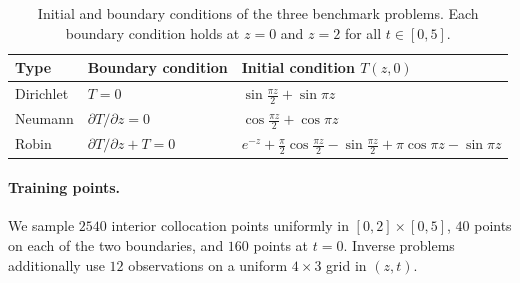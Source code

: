 \begin{table}[h]
\centering
\caption{Initial and boundary conditions of the three benchmark problems. Each boundary condition holds at
$z=0$ and $z=2$ for all $t\in[0,5]$.}
\label{tab:bc}
\small
\begin{tabular}{@{}lll@{}}
\toprule
Type & Boundary condition & Initial condition $T(z,0)$ \\
\midrule
Dirichlet & $T=0$ & $\sin\frac{\pi z}{2}+\sin\pi z$ \\
Neumann   & $\partial T/\partial z=0$ & $\cos\frac{\pi z}{2}+\cos\pi z$ \\
Robin     & $\partial T/\partial z+T=0$ &
  $e^{-z}+\frac{\pi}{2}\cos\frac{\pi z}{2}-\sin\frac{\pi z}{2}+\pi\cos\pi z-\sin\pi z$ \\
\bottomrule
\end{tabular}
\end{table}

\paragraph{Training points.}
We sample $2540$ interior collocation points uniformly in $[0,2]\times[0,5]$, $40$ points on each of the two
boundaries, and $160$ points at $t=0$. Inverse problems additionally use $12$ observations on a uniform
$4\times3$ grid in $(z,t)$.

